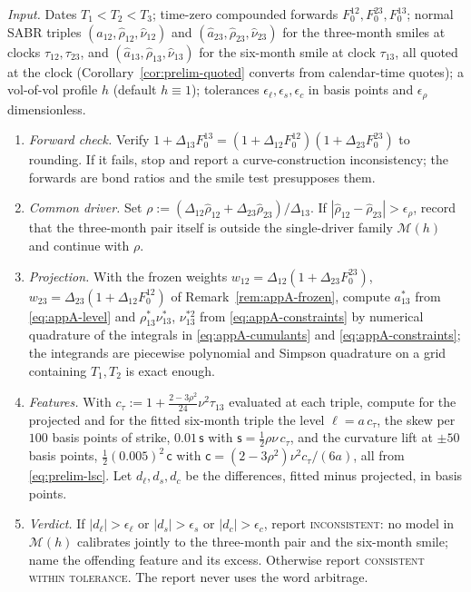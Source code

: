 \documentclass[../../main.tex]{subfiles}
\begin{document}
\begin{algorithmenv}\label{alg:appA-diagnostic}
\emph{Input.} Dates $T_1<T_2<T_3$; time-zero compounded forwards $F^{12}_0,F^{23}_0,F^{13}_0$; normal SABR triples $(\hat a_{12},\hat\rho_{12},\hat\nu_{12})$ and $(\hat a_{23},\hat\rho_{23},\hat\nu_{23})$ for the three-month smiles at clocks $\tau_{12},\tau_{23}$, and $(\hat a_{13},\hat\rho_{13},\hat\nu_{13})$ for the six-month smile at clock $\tau_{13}$, all quoted at the clock (Corollary~\ref{cor:prelim-quoted} converts from calendar-time quotes); a vol-of-vol profile $h$ (default $h\equiv1$); tolerances $\epsilon_\ell,\epsilon_s,\epsilon_c$ in basis points and $\epsilon_\rho$ dimensionless.
\begin{enumerate}[nosep,label=\arabic*.]
\item \emph{Forward check.} Verify $1+\Delta_{13}F^{13}_0=(1+\Delta_{12}F^{12}_0)(1+\Delta_{23}F^{23}_0)$ to rounding. If it fails, stop and report a curve-construction inconsistency; the forwards are bond ratios and the smile test presupposes them.
\item \emph{Common driver.} Set $\rho:=(\Delta_{12}\hat\rho_{12}+\Delta_{23}\hat\rho_{23})/\Delta_{13}$. If $|\hat\rho_{12}-\hat\rho_{23}|>\epsilon_\rho$, record that the three-month pair itself is outside the single-driver family $\mathcal M(h)$ and continue with $\rho$.
\item \emph{Projection.} With the frozen weights $w_{12}=\Delta_{12}(1+\Delta_{23}F^{23}_0)$, $w_{23}=\Delta_{23}(1+\Delta_{12}F^{12}_0)$ of Remark~\ref{rem:appA-frozen}, compute $a_{13}^*$ from \eqref{eq:appA-level} and $\rho_{13}^*\nu_{13}^*$, $\nu_{13}^{*2}$ from \eqref{eq:appA-constraints} by numerical quadrature of the integrals in \eqref{eq:appA-cumulants} and \eqref{eq:appA-constraints}; the integrands are piecewise polynomial and Simpson quadrature on a grid containing $T_1,T_2$ is exact enough.
\item \emph{Features.} With $c_\tau:=1+\frac{2-3\rho^2}{24}\nu^2\tau_{13}$ evaluated at each triple, compute for the projected and for the fitted six-month triple the level $\ell=a\,c_\tau$, the skew per $100$ basis points of strike, $0.01\,\mathsf s$ with $\mathsf s=\tfrac12\rho\nu\,c_\tau$, and the curvature lift at $\pm50$ basis points, $\tfrac12(0.005)^2\,\mathsf c$ with $\mathsf c=(2-3\rho^2)\nu^2c_\tau/(6a)$, all from \eqref{eq:prelim-lsc}. Let $d_\ell,d_s,d_c$ be the differences, fitted minus projected, in basis points.
\item \emph{Verdict.} If $|d_\ell|>\epsilon_\ell$ or $|d_s|>\epsilon_s$ or $|d_c|>\epsilon_c$, report \textsc{inconsistent}: no model in $\mathcal M(h)$ calibrates jointly to the three-month pair and the six-month smile; name the offending feature and its excess. Otherwise report \textsc{consistent within tolerance}. The report never uses the word arbitrage.

\end{enumerate}
\end{algorithmenv}
\end{document}
